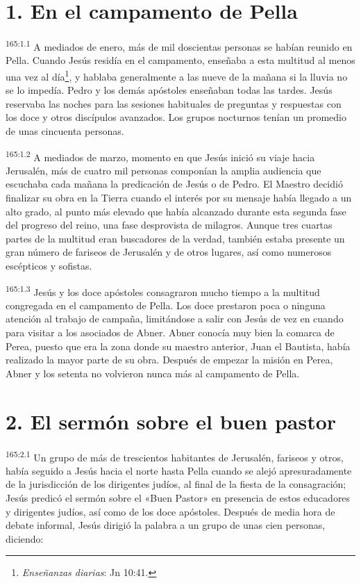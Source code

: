 \section*{1. En el campamento de Pella}
\par
\textsuperscript{165:1.1} A mediados de enero, más de mil doscientas personas se habían reunido en Pella. Cuando Jesús residía en el campamento, enseñaba a esta multitud al menos una vez al día\footnote{\textit{Enseñanzas diarias}: Jn 10:41.}, y hablaba generalmente a las nueve de la mañana si la lluvia no se lo impedía. Pedro y los demás apóstoles enseñaban todas las tardes. Jesús reservaba las noches para las sesiones habituales de preguntas y respuestas con los doce y otros discípulos avanzados. Los grupos nocturnos tenían un promedio de unas cincuenta personas.

\par
\textsuperscript{165:1.2} A mediados de marzo, momento en que Jesús inició su viaje hacia Jerusalén, más de cuatro mil personas componían la amplia audiencia que escuchaba cada mañana la predicación de Jesús o de Pedro. El Maestro decidió finalizar su obra en la Tierra cuando el interés por su mensaje había llegado a un alto grado, al punto más elevado que había alcanzado durante esta segunda fase del progreso del reino, una fase desprovista de milagros. Aunque tres cuartas partes de la multitud eran buscadores de la verdad, también estaba presente un gran número de fariseos de Jerusalén y de otros lugares, así como numerosos escépticos y sofistas.

\par
\textsuperscript{165:1.3} Jesús y los doce apóstoles consagraron mucho tiempo a la multitud congregada en el campamento de Pella. Los doce prestaron poca o ninguna atención al trabajo de campaña, limitándose a salir con Jesús de vez en cuando para visitar a los asociados de Abner. Abner conocía muy bien la comarca de Perea, puesto que era la zona donde su maestro anterior, Juan el Bautista, había realizado la mayor parte de su obra. Después de empezar la misión en Perea, Abner y los setenta no volvieron nunca más al campamento de Pella.

\section*{2. El sermón sobre el buen pastor}
\par
\textsuperscript{165:2.1} Un grupo de más de trescientos habitantes de Jerusalén, fariseos y otros, había seguido a Jesús hacia el norte hasta Pella cuando se alejó apresuradamente de la jurisdicción de los dirigentes judíos, al final de la fiesta de la consagración; Jesús predicó el sermón sobre el «Buen Pastor» en presencia de estos educadores y dirigentes judíos, así como de los doce apóstoles. Después de media hora de debate informal, Jesús dirigió la palabra a un grupo de unas cien personas, diciendo:

